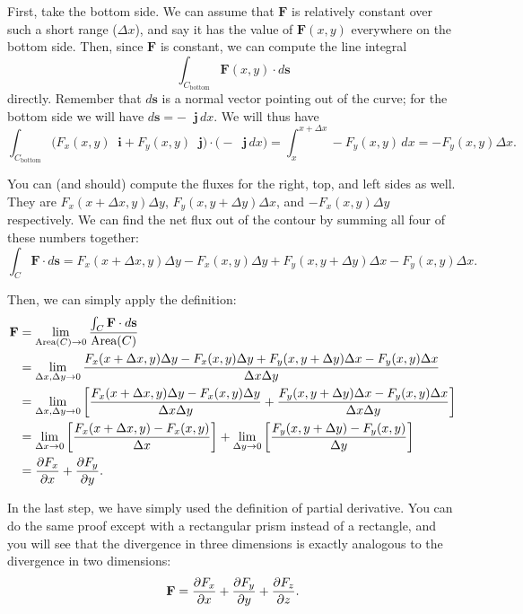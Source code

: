 \documentclass{myarticle}
\let\div\relax
\DeclareMathOperator{\div}{div}
\renewcommand{\vec}[1]{\mathbf{#1}}
\newcommand{\unitvector}[1]{
  \mathop{}\!\vec{#1}
}
\newcommand{\ih}{\unitvector{i}}
\newcommand{\jh}{\unitvector{j}}
\theoremstyle{nospace}
\newtheorem{old series theorem}{Theorem}
\newenvironment{series theorem}{\begin{mdframed}\begin{old series theorem}}{\end{old series theorem}\end{mdframed}}
\begin{document}
First, take the bottom side. We can assume that $\vec{F}$ is relatively constant over such a short range ($\Delta x$), and say it has the value of $\vec{F}(x, y)$ everywhere on the bottom side. Then, since $\vec{F}$ is constant, we can compute the line integral \[ \int_{C_\text{bottom}} \vec{F}(x, y) \cdot d\vec{s} \] directly. Remember that $d\vec{s}$ is a normal vector pointing out of the curve; for the bottom side we will have $d\vec{s} = -\jh \,dx$. We will thus have \[ \int_{C_\text{bottom}} \big(F_x(x, y) \ih + F_y(x, y) \jh\big) \cdot \big(-\jh \,dx\big) = \int_x^{x + \Delta x} -F_y(x, y) \,dx = -F_y(x, y) \Delta x. \]

You can (and should) compute the fluxes for the right, top, and left sides as well. They are $F_x(x + \Delta x, y) \Delta y$, $F_y(x, y + \Delta y) \Delta x$, and $-F_x(x, y) \Delta y$ respectively. We can find the net flux out of the contour by summing all four of these numbers together: \[ \int_C \vec{F} \cdot d\vec{s} = F_x(x + \Delta x, y)\Delta y - F_x(x, y)\Delta y + F_y(x, y + \Delta y)\Delta x - F_y(x, y)\Delta x. \]

Then, we can simply apply the definition:
\begin{align*}
\div \vec{F} &= \lim_{\text{Area}(C) \to 0} \frac{\int_C \vec{F} \cdot d\vec{s}}{\text{Area}(C)} \\
&= \lim_{\Delta x, \Delta y \to 0} \frac{F_x(x + \Delta x, y)\Delta y - F_x(x, y)\Delta y + F_y(x, y + \Delta y)\Delta x - F_y(x, y)\Delta x}{\Delta x \Delta y} \\
&= \lim_{\Delta x, \Delta y \to 0} \left[\frac{F_x(x + \Delta x, y)\Delta y - F_x(x, y)\Delta y}{\Delta x \Delta y} + \frac{F_y(x, y + \Delta y)\Delta x - F_y(x, y)\Delta x}{\Delta x \Delta y}\right] \\
&= \lim_{\Delta x \to 0} \left[\frac{F_x(x + \Delta x, y) - F_x(x, y)}{\Delta x}\right] + \lim_{\Delta y \to 0} \left[\frac{F_y(x, y + \Delta y) - F_y(x, y)}{\Delta y}\right] \\
&= \frac{\partial F_x}{\partial x} + \frac{\partial F_y}{\partial y}.
\end{align*}

In the last step, we have simply used the definition of partial derivative. You can do the same proof except with a rectangular prism instead of a rectangle, and you will see that the divergence in three dimensions is exactly analogous to the divergence in two dimensions: \[ \div \vec{F} = \frac{\partial F_x}{\partial x} + \frac{\partial F_y}{\partial y} + \frac{\partial F_z}{\partial z}. \]
\end{document}

